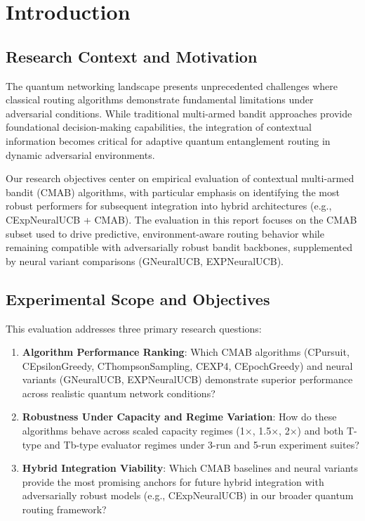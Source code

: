 \documentclass[12pt,a4paper]{article}
\begin{document}
\newpage
\section{Introduction}

\subsection{Research Context and Motivation}

The quantum networking landscape presents unprecedented challenges where classical routing algorithms demonstrate fundamental limitations under adversarial conditions. While traditional multi-armed bandit approaches provide foundational decision-making capabilities, the integration of contextual information becomes critical for adaptive quantum entanglement routing in dynamic adversarial environments.

Our research objectives center on empirical evaluation of contextual multi-armed bandit (CMAB) algorithms, with particular emphasis on identifying the most robust performers for subsequent integration into hybrid architectures (e.g., CExpNeuralUCB + CMAB). The evaluation in this report focuses on the CMAB subset used to drive predictive, environment-aware routing behavior while remaining compatible with adversarially robust bandit backbones, supplemented by neural variant comparisons (GNeuralUCB, EXPNeuralUCB).

\subsection{Experimental Scope and Objectives}

This evaluation addresses three primary research questions:

\begin{enumerate}
\item \textbf{Algorithm Performance Ranking}: Which CMAB algorithms (CPursuit, CEpsilonGreedy, CThompsonSampling, CEXP4, CEpochGreedy) and neural variants (GNeuralUCB, EXPNeuralUCB) demonstrate superior performance across realistic quantum network conditions?
\item \textbf{Robustness Under Capacity and Regime Variation}: How do these algorithms behave across scaled capacity regimes (1$\times$, 1.5$\times$, 2$\times$) and both T-type and Tb-type evaluator regimes under 3-run and 5-run experiment suites?
\item \textbf{Hybrid Integration Viability}: Which CMAB baselines and neural variants provide the most promising anchors for future hybrid integration with adversarially robust models (e.g., CExpNeuralUCB) in our broader quantum routing framework?
\end{enumerate}
\end{document}
